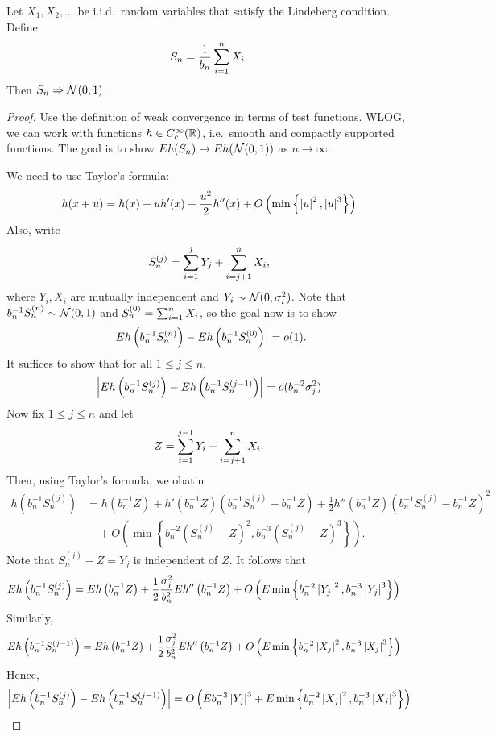 \documentclass[a4paper]{article}
\newcommand{\convd}{\Rightarrow}
\begin{document}
\begin{thm}
  Let $X_1, X_2, \dots$ be i.i.d.\ random variables that satisfy
  the Lindeberg condition. Define
  \[
    S_n = \frac{1}{b_n} \sum_{i=1}^n X_i.
  \]
  Then $S_n \convd \ncal (0, 1)$.
\end{thm}

\begin{proof}
  Use the definition of weak convergence in terms of test functions.
  WLOG, we can work with functions $h \in C^\infty_c (\mathbb{R})$, i.e.\ smooth
  and compactly supported functions. The goal is to show
  $E h(S_n) \to E h (\mathcal{N}(0, 1))$ as $n \to \infty$.

  We need to use Taylor's formula:
  \[
    h (x + u) = h(x) + u h' (x) + \frac{u^2}{2} h''(x) +
    O \left( \min \left\{ \left\lvert u\right\rvert^2, \left\lvert u\right\rvert^3 \right\} \right)
  \]
  Also, write
  \[
    S_n^{(j)} = \sum_{i=1}^j Y_j + \sum_{i = j + 1}^n X_i,
  \]
  where $Y_i, X_i$ are mutually independent and $Y_i \sim \mathcal{N}(0, \sigma_i^2)$.
  Note that $b_n^{-1} S_n^{(n)} \sim \mathcal{N}(0, 1)$ and
  $S_n^{(0)} = \sum_{i=1}^n X_i$, so the goal now is to show
  \[
    \left\lvert E h \left( b_n^{-1} S_n^{(n)} \right) - E h \left( b_n^{-1} S_n^{(0)} \right)\right\rvert
    = o(1).
  \]
  It suffices to show that for all $1 \leq j \leq n$,
  \[
    \left\lvert E h \left( b_n^{-1} S_n^{(j)} \right) - E h \left( b_n^{-1} S_n^{(j - 1)} \right)\right\rvert
    = o(b_n^{-2} \sigma_j^2)
  \]
  Now fix $1 \leq j \leq n$ and let
  \[
    Z = \sum_{i=1}^{j - 1} Y_i + \sum_{i = j + 1}^n X_i.
  \]
  Then, using Taylor's formula, we obatin
  \begin{align*}
    h \left( b_n^{-1} S_n^{(j)} \right)
     & =  h \left( b_n^{-1} Z \right)
    + h' \left( b_n^{-1} Z \right) \left( b_n^{-1} S_n^{(j)} - b_n^{-1} Z \right)
    + \frac{1}{2} h'' \left( b_n^{-1} Z \right) \left( b_n^{-1} S_n^{(j)} - b_n^{-1} Z \right)^2 \\
     & \quad + O \left( \min \left\{ b_n^{-2} (S_n^{(j)} - Z)^2,
    b_n^{-3} (S_n^{(j)} - Z)^3 \right\} \right).
  \end{align*}
  Note that $S_n^{(j)} - Z = Y_j$ is independent of $Z$.
  It follows that
  \begin{align*}
    E h \left( b_n^{-1} S_n^{(j)} \right)
     & = E h \left( b_n^{-1} Z \right)
    + \frac{1}{2} \frac{\sigma_j^2}{b_n^2} E h'' \left( b_n^{-1} Z \right)
    + O \left( E \min \left\{ b_n^{-2} \left\lvert Y_j\right\rvert^{2},
    b_n^{-3} \left\lvert Y_j\right\rvert^3 \right\} \right)
  \end{align*}
  Similarly,
  \begin{align*}
    E h \left( b_n^{-1} S_n^{(j - 1)} \right)
     & = E h \left( b_n^{-1} Z \right)
    + \frac{1}{2} \frac{\sigma_j^2}{b_n^2} E h'' \left( b_n^{-1} Z \right)
    + O \left( E \min \left\{ b_n^{-2} \left\lvert X_j\right\rvert^{2},
    b_n^{-3} \left\lvert X_j\right\rvert^3 \right\} \right)
  \end{align*}
  Hence,
  \[
    \left\lvert E h\left( b_n^{-1} S_n^{(j)} \right) - E h \left( b_n^{-1} S_n^{(j - 1)} \right)\right\rvert
    = O \left( E b_n^{-3} \left\lvert Y_j\right\rvert^3
    + E \min \left\{ b_n^{-2} \left\lvert X_j\right\rvert^{2},
    b_n^{-3} \left\lvert X_j\right\rvert^3 \right\} \right)
  \]


\end{proof}
\end{document}
